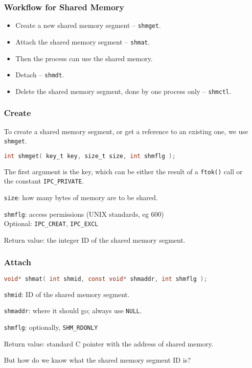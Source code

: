 \begin{frame}
	\frametitle{Workflow for Shared Memory}

	\begin{itemize}
		\item Create a new shared memory segment -- \texttt{shmget}.
		\item Attach the shared memory segment -- \texttt{shmat}.
		\item Then the process can use the shared memory.
		\item Detach -- \texttt{shmdt}.
		\item Delete the shared memory segment, done by one process only -- \texttt{shmctl}.
	\end{itemize}

\end{frame}


\begin{frame}[fragile]
	\frametitle{Create}

	To create a shared memory segment, or get a reference to an existing one, we use \texttt{shmget}.

	\begin{lstlisting}[language=C]
int shmget( key_t key, size_t size, int shmflg );
\end{lstlisting}

	The first argument is the key, which can be either the result of a \texttt{ftok()} call or the constant \texttt{IPC\_PRIVATE}.

	\texttt{size}: how many bytes of memory are to be shared.

	\texttt{shmflg}: access permissions (UNIX standards, eg 600)\\
	\quad Optional: \texttt{IPC\_CREAT}, \texttt{IPC\_EXCL}

	Return value: the integer ID of the shared memory segment.
\end{frame}

\begin{frame}[fragile]
	\frametitle{Attach}
	\begin{lstlisting}[language=C]
void* shmat( int shmid, const void* shmaddr, int shmflg );
\end{lstlisting}

	\texttt{shmid}: ID of the shared memory segment.

	\texttt{shmaddr}: where it should go; always use \texttt{NULL}.

	\texttt{shmflg}: optionally, \texttt{SHM\_RDONLY}

	Return value: standard C pointer with the address of shared memory.

	But how do we know what the shared memory segment ID is?

\end{frame}

